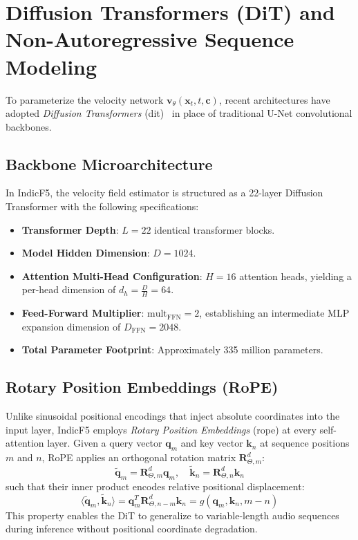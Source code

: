 \section{Diffusion Transformers (DiT) and Non-Autoregressive Sequence Modeling}
To parameterize the velocity network $\mathbf{v}_\theta(\mathbf{x}_t, t, \mathbf{c})$, recent architectures have adopted \textit{Diffusion Transformers} (\acrshort{dit})~\cite{peebles2023dit,chen2024f5tts} in place of traditional U-Net convolutional backbones.

\subsection{Backbone Microarchitecture}
In IndicF5, the velocity field estimator is structured as a 22-layer Diffusion Transformer with the following specifications:
\begin{itemize}
    \item \textbf{Transformer Depth}: $L = 22$ identical transformer blocks.
    \item \textbf{Model Hidden Dimension}: $D = 1024$.
    \item \textbf{Attention Multi-Head Configuration}: $H = 16$ attention heads, yielding a per-head dimension of $d_h = \frac{D}{H} = 64$.
    \item \textbf{Feed-Forward Multiplier}: $\text{mult}_{\text{FFN}} = 2$, establishing an intermediate MLP expansion dimension of $D_{\text{FFN}} = 2048$.
    \item \textbf{Total Parameter Footprint}: Approximately 335 million parameters.
\end{itemize}

\subsection{Rotary Position Embeddings (RoPE)}
Unlike sinusoidal positional encodings that inject absolute coordinates into the input layer, IndicF5 employs \textit{Rotary Position Embeddings} (\acrshort{rope}) at every self-attention layer. Given a query vector $\mathbf{q}_m$ and key vector $\mathbf{k}_n$ at sequence positions $m$ and $n$, RoPE applies an orthogonal rotation matrix $\mathbf{R}_{\Theta, m}^d$:
\begin{equation}
    \tilde{\mathbf{q}}_m = \mathbf{R}_{\Theta, m}^d \mathbf{q}_m, \quad \tilde{\mathbf{k}}_n = \mathbf{R}_{\Theta, n}^d \mathbf{k}_n
    \label{eq:rope_rotation}
\end{equation}
such that their inner product encodes relative positional displacement:
\begin{equation}
    \langle \tilde{\mathbf{q}}_m, \tilde{\mathbf{k}}_n \rangle = \mathbf{q}_m^T \mathbf{R}_{\Theta, n-m}^d \mathbf{k}_n = g(\mathbf{q}_m, \mathbf{k}_n, m - n)
    \label{eq:rope_relative}
\end{equation}
This property enables the DiT to generalize to variable-length audio sequences during inference without positional coordinate degradation.

